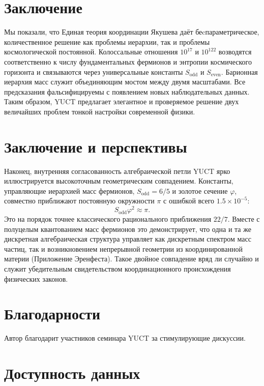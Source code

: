 \documentclass[11pt,a4paper]{article}
\theoremstyle{remark}
\begin{document}
	\section{Заключение}
	
	Мы показали, что Единая теория координации Якушева даёт беcпараметрическое, количественное решение как проблемы иерархии, так и проблемы космологической постоянной. Колоссальные отношения \(10^{17}\) и \(10^{122}\) возводятся соответственно к числу фундаментальных фермионов и энтропии космического горизонта и связываются через универсальные константы \(S_{\mathrm{odd}}\) и \(S_{\mathrm{even}}\). Барионная иерархия масс служит объединяющим мостом между двумя масштабами. Все предсказания фальсифицируемы с появлением новых наблюдательных данных. Таким образом, YUCT предлагает элегантное и проверяемое решение двух величайших проблем тонкой настройки современной физики.
	
	\section*{Заключение и перспективы}
	
	Наконец, внутренняя согласованность алгебраической петли YUCT ярко иллюстрируется высокоточным геометрическим совпадением. Константы, управляющие иерархией масс фермионов, \(S_{\mathrm{odd}}=6/5\) и золотое сечение \(\varphi\), совместно приближают постоянную окружности \(\pi\) с ошибкой всего \(1.5\times10^{-5}\):
	\[
	S_{\mathrm{odd}}\varphi^2 \approx \pi .
	\]
	Это на порядок точнее классического рационального приближения \(22/7\). Вместе с полуцелым квантованием масс фермионов это демонстрирует, что одна и та же дискретная алгебраическая структура управляет как дискретным спектром масс частиц, так и возникновением непрерывной геометрии из координированной материи (Приложение Эренфеста). Такое двойное совпадение вряд ли случайно и служит убедительным свидетельством координационного происхождения физических законов.
	
	\section*{Благодарности}
	
	Автор благодарит участников семинара YUCT за стимулирующие дискуссии.
	
	\section*{Доступность данных}
	
\end{document}
